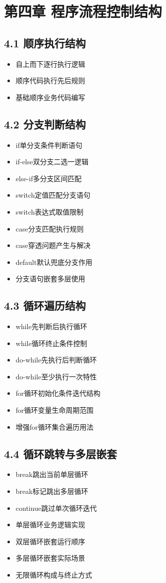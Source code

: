 \section{第四章 程序流程控制结构}
\subsection{4.1 顺序执行结构}
\begin{itemize}
\item 自上而下逐行执行逻辑
\item 顺序代码执行先后规则
\item 基础顺序业务代码编写
\end{itemize}

\subsection{4.2 分支判断结构}
\begin{itemize}
\item if单分支条件判断语句
\item if-else双分支二选一逻辑
\item else-if多分支区间匹配
\item switch定值匹配分支语句
\item switch表达式取值限制
\item case分支匹配执行规则
\item case穿透问题产生与解决
\item default默认兜底分支作用
\item 分支语句嵌套多层使用
\end{itemize}

\subsection{4.3 循环遍历结构}
\begin{itemize}
\item while先判断后执行循环
\item while循环终止条件控制
\item do-while先执行后判断循环
\item do-while至少执行一次特性
\item for循环初始化条件迭代结构
\item for循环变量生命周期范围
\item 增强for循环集合遍历用法
\end{itemize}

\subsection{4.4 循环跳转与多层嵌套}
\begin{itemize}
\item break跳出当前单层循环
\item break标记跳出多层循环
\item continue跳过单次循环迭代
\item 单层循环业务逻辑实现
\item 双层循环嵌套运行顺序
\item 多层循环嵌套实际场景
\item 无限循环构成与终止方式
\end{itemize}

